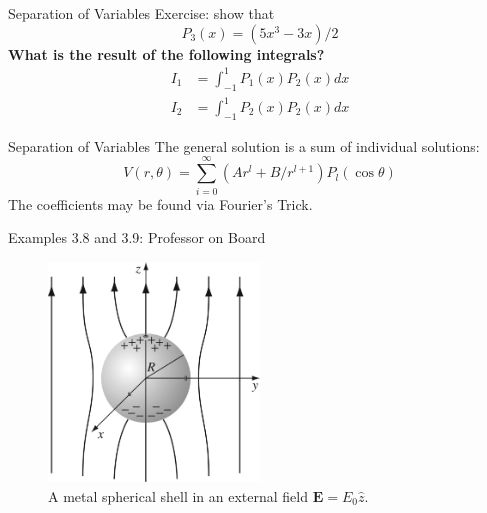 \documentclass{beamer}
\begin{document}
\begin{frame}{Separation of Variables}
Exercise: show that 
\begin{equation}
P_3(x) = (5x^3 - 3x)/2
\end{equation}
\alert{\textbf{What is the result of the following integrals?}}
\begin{align}
I_1 &= \int_{-1}^{1} P_1(x) P_2(x) dx \\
I_2 &= \int_{-1}^{1} P_2(x) P_2(x) dx
\end{align}
\end{frame}

\begin{frame}{Separation of Variables}
The general solution is a sum of individual solutions:
\begin{equation}
V(r,\theta) = \sum_{i = 0}^{\infty} \left( Ar^l + B/r^{l+1} \right) P_l(\cos\theta)
\end{equation}
The coefficients may be found via Fourier's Trick.
\end{frame}

\begin{frame}{Examples 3.8 and 3.9: Professor on Board}
\begin{figure}
\includegraphics[width=0.5\textwidth]{figures/3_24.jpg}
\caption{\label{fig:ex_sphere} A metal spherical shell in an external field $\mathbf{E} = E_0 \hat{z}$.}
\end{figure}
\end{frame}
\end{document}
